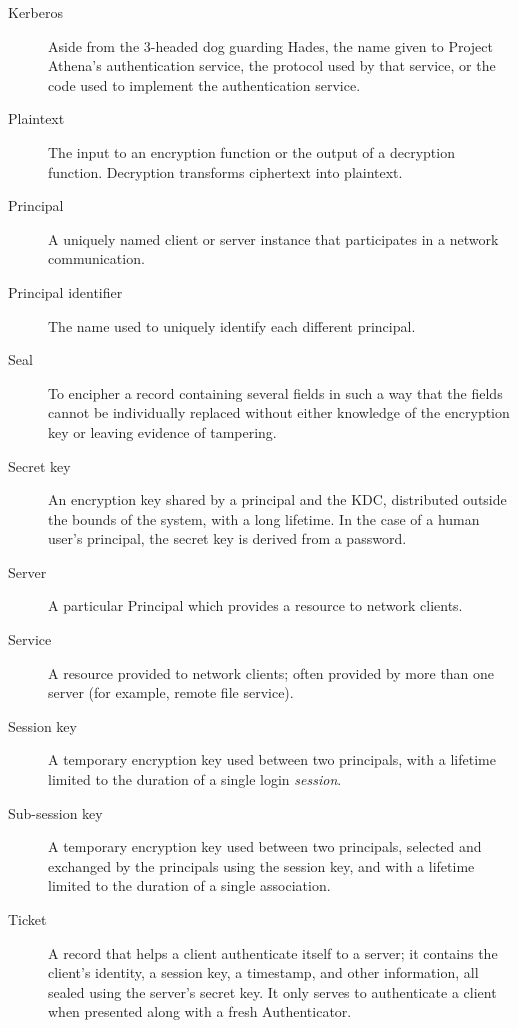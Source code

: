 \begin{description}
\item [Kerberos]
Aside from the 3-headed dog guarding Hades, the name given
to Project Athena's authentication service, the protocol used by that
service, or the code used to implement the authentication service.

\item [Plaintext]
The input to an encryption function or the output of a decryption
function.  Decryption transforms ciphertext into plaintext.

\item [Principal]
A uniquely named client or server instance that participates in
a network communication.

\item [Principal identifier]
The name used to uniquely identify each different
principal.

\item [Seal]
To encipher a record containing several fields in such a way
that the fields cannot be individually replaced without either
knowledge of the encryption key or leaving evidence of tampering.

\item [Secret key]
An encryption key shared by a principal and the KDC,
distributed outside the bounds of the system, with a long lifetime.
In the case of a human user's principal, the secret key is derived from a
password.

\item [Server]
A particular Principal which provides a resource to network clients.

\item [Service]
A resource provided to network clients; often provided by more than one
server (for example, remote file service).

\item [Session key]
A temporary encryption key used between two principals,
with a lifetime limited to the duration of a single login
{\em session}.

\item [Sub-session key] 
A temporary encryption key used between two
principals, selected and exchanged by the principals using the session
key, and with a lifetime limited to the duration of a single
association.

\item [Ticket]
A record that helps a client authenticate itself to a server; it contains
the client's identity, a session key, a timestamp, and other
information, all sealed using the server's secret key.  It only serves to
authenticate a client when presented along with a fresh Authenticator.
\end{description}

